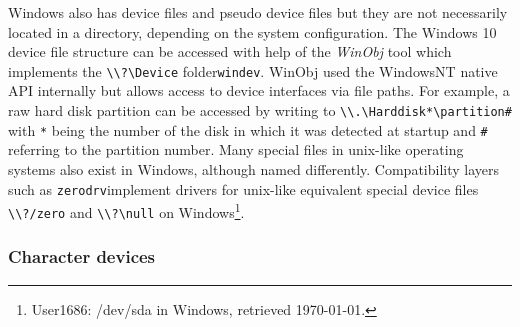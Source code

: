 Windows also has device files and pseudo device files but they are not necessarily located in a directory, depending
on the system configuration. The Windows 10 device file structure can be accessed with help of the \textit{WinObj} tool which
implements the \texttt{\backslash \backslash ?\backslash Device} folder\texttt{windev}. WinObj used the WindowsNT native API internally but allows access to device interfaces
via file paths. For example, a raw hard disk partition can be accessed by writing to \texttt{\backslash \backslash .\Device\backslash Harddisk*\backslash partition#}
with \texttt{*} being the number of the disk in which it was detected at startup and \texttt{\#} referring to the partition number.
Many special files in unix-like operating systems also exist in Windows, although named differently. Compatibility layers
such as \texttt{zerodrv}implement drivers for unix-like equivalent special device files \texttt{\backslash \backslash ?\Device/zero} and \texttt{\backslash \backslash ?\Devices\backslash null}
on Windows\footnote{ User1686: /dev/sda in Windows, retrieved \today.}.


\subsubsection{Character devices}
